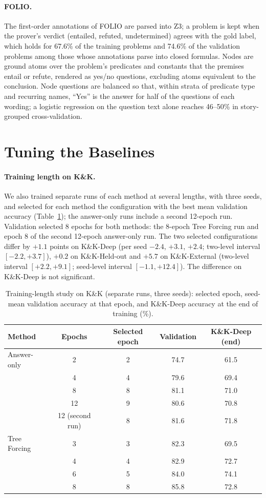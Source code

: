 \documentclass[10pt]{article}
\newcommand{\tf}{Tree Forcing}
\begin{document}
\paragraph{FOLIO.} The first-order annotations of FOLIO are parsed into Z3; a problem is kept when the prover's verdict
(entailed, refuted, undetermined) agrees with the gold label, which holds for 67.6\% of the training problems and
74.6\% of the validation problems among those whose annotations parse into closed formulas. Nodes are ground atoms over the problem's predicates and constants that the premises
entail or refute, rendered as yes/no questions, excluding atoms equivalent to the conclusion. Node questions are
balanced so that, within strata of predicate type and recurring names, ``Yes'' is the answer for half of the questions
of each wording; a logistic regression on the question text alone reaches 46--50\% in story-grouped cross-validation.

\section{Tuning the Baselines}
\label{app:tuning}
\paragraph{Training length on K\&K.} We also trained separate runs of each method at several lengths, with three seeds,
and selected for each method the configuration with the best mean validation accuracy (Table~\ref{tab:tuning}); the
answer-only runs include a second 12-epoch run. Validation selected 8 epochs for both methods: the 8-epoch \tf{} run
and epoch 8 of the second 12-epoch answer-only run. The two selected configurations differ by $+1.1$ points on K\&K-Deep (per seed $-2.4$, $+3.1$, $+2.4$;
two-level interval $[-2.2, +3.7]$), $+0.2$ on K\&K-Held-out and $+5.7$ on K\&K-External (two-level interval $[+2.2,
+9.1]$; seed-level interval $[-1.1, +12.4]$). The difference on K\&K-Deep is not significant.

\begin{table}[h]
\centering
\small
\caption{Training-length study on K\&K (separate runs, three seeds): selected epoch, seed-mean validation accuracy at
that epoch, and K\&K-Deep accuracy at the end of training (\%).}
\label{tab:tuning}
\begin{tabular}{lcccc}
\toprule
Method & Epochs & Selected epoch & Validation & K\&K-Deep (end) \\
\midrule
Answer-only & 2 & 2 & 74.7 & 61.5 \\
 & 4 & 4 & 79.6 & 69.4 \\
 & 8 & 8 & 81.1 & 71.0 \\
 & 12 & 9 & 80.6 & 70.8 \\
 & 12 (second run) & 8 & 81.6 & 71.8 \\
\tf{} & 3 & 3 & 82.3 & 69.5 \\
 & 4 & 4 & 82.9 & 72.7 \\
 & 6 & 5 & 84.0 & 74.1 \\
 & 8 & 8 & 85.8 & 72.8 \\
\bottomrule
\end{tabular}
\end{table}
\end{document}
